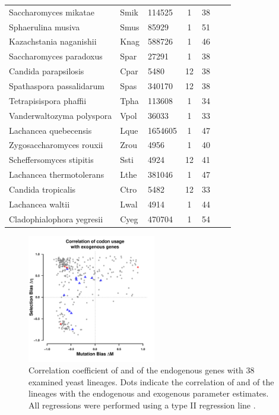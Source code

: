 \documentclass[fleqn,letterpaper]{article}
\begin{document}
\begin{table}
\begin{tabular}{  l  l  l  c  c  l  l  }
	Saccharomyces mikatae 		& Smik 		& 114525 		&	1	& 38 	 \\
	Sphaerulina musiva 		& Smus 		& 85929 		&	1	& 51 	 \\ 
	Kazachstania naganishii 	& Knag 		& 588726 		&	1	& 46 	 \\ 
	Saccharomyces paradoxus 	& Spar 		& 27291 		&	1	& 38 	 \\ 
	Candida parapsilosis 		& Cpar 		& 5480 			&	12	& 38 	 \\ 
	Spathaspora passalidarum 	& Spas 		& 340170 		&	12	& 38 	 \\ 
	Tetrapisispora phaffii 		& Tpha 		& 113608 		&	1	& 34 	 \\ 
	Vanderwaltozyma polyspora 	& Vpol 		& 36033 		&	1	& 33 	 \\ 
	Lachancea quebecensis 		& Lque 		& 1654605 		&	1	& 47 	 \\ 
	Zygosaccharomyces rouxii 	& Zrou 		& 4956 			&	1	& 40 	 \\ 
	Scheffersomyces stipitis 	& Ssti 		& 4924 			&	12	& 41 	 \\ 
	Lachancea thermotolerans 	& Lthe 		& 381046 		&	1	& 47 	 \\ 
	Candida tropicalis 		& Ctro 		& 5482 			&	12	& 33 	 \\ 
	Lachancea waltii 		& Lwal 		& 4914 			&	1	& 44 	 \\ 
	Cladophialophora yegresii 	& Cyeg 		& 470704 		&	1	& 54 	 \\ \hline
\end{tabular}
\label{tab:org_overview}
\end{table}
\clearpage


\null
\vfill
\begin{figure}
     \centering
	\includegraphics[width=0.5\textwidth]{img/csp_mean_correlation_exo.pdf}
	\caption{Correlation coefficient of \DM and \DE of the endogenous genes with 38 examined yeast lineages. 
	Dots indicate the correlation of \DM and \DE of the lineages with the endogenous and exogenous parameter estimates. 
	All regressions were performed using a type II regression line \citep{SokalAndRohlf1981}.}
	\label{fig:csp_endo_comp}
\end{figure}
\null
\vfill
\clearpage
\null
\vfill
\end{document}
